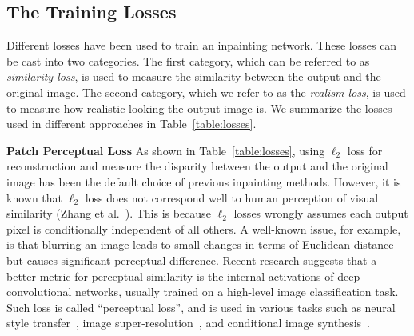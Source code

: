 \subsection{The Training Losses}
Different losses have been used to train an inpainting network. These losses can be cast into two categories. The first category, which can be referred to as \textit{similarity loss}, is used to measure the similarity between the output and the original image. The second category, which we refer to as the \textit{realism loss}, is used to measure how realistic-looking the output image is. We summarize the losses used in different approaches in Table~\ref{table:losses}. 

\begin{table}[h!]
\begin{center}

  \end{center}
  \caption{Comparison of training losses in different methods.}
  \vspace{-10pt}
  \label{table:losses}
\end{table}

\noindent\textbf{Patch Perceptual Loss} As shown in Table~\ref{table:losses}, using $\ell_2$ loss for reconstruction and measure the disparity between the output and the original image has been the default choice of previous inpainting methods. However, it is known that $\ell_2$ loss does not correspond well to human perception of visual similarity (Zhang et al.~\cite{zhang2018unreasonable}). This is because $\ell_2$ losses wrongly assumes each output pixel is conditionally independent of all others. A well-known issue, for example, is that blurring an image leads to small changes in terms of Euclidean distance but causes significant perceptual difference. Recent research suggests that a better metric for perceptual similarity is the internal activations of deep convolutional networks, usually trained on a high-level image classification task. Such loss is called ``perceptual loss'', and is used in various tasks such as neural style transfer~\cite{gatys2016image}, image super-resolution~\cite{johnson2016perceptual}, and conditional image synthesis~\cite{dosovitskiy2016generating,chen2017photographic}.


